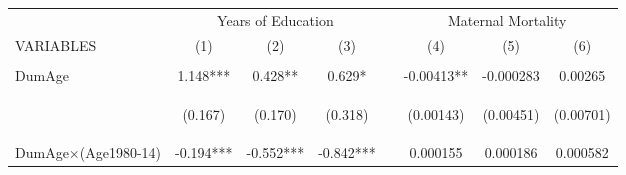 \begin{subtables}
\begin{landscape}														
\begin{table}[htpb!]														
\begin{center}														
\begin{tabular}{lcccp{0.3cm}ccc}	\toprule													
& 	\multicolumn{3}{c}{Years of Education}					& &\multicolumn{3}{c}{Maternal Mortality }	\\	
VARIABLES & 		(1)	&	(2)	&	(3)	&&	(4)	&	(5)	&	(6)	\\ \cline{1-4} \cline{6-8}	
\vspace{4pt}	&	\begin{footnotesize}\end{footnotesize}	&	\begin{footnotesize}\end{footnotesize}	&	\begin{footnotesize}\end{footnotesize}	& \begin{footnotesize}\end{footnotesize} &	\begin{footnotesize}\end{footnotesize}	&	\begin{footnotesize}\end{footnotesize}	&		\begin{footnotesize}\end{footnotesize}	 \\
DumAge  	&	1.148***	&	0.428**	&	0.629*	&&	-0.00413**	&	-0.000283	&	0.00265	 \\	
	& \begin{footnotesize}	(0.167)	\end{footnotesize} & \begin{footnotesize}	(0.170)	\end{footnotesize} & \begin{footnotesize}	(0.318)	\end{footnotesize} & \begin{footnotesize}\end{footnotesize} & \begin{footnotesize}	(0.00143)	\end{footnotesize} & \begin{footnotesize}	(0.00451)	\end{footnotesize} & \begin{footnotesize}	(0.00701)	\end{footnotesize} \\	
DumAge$\times$(Age1980-14)	&	-0.194***	&	-0.552***	&	-0.842***	&&	0.000155	&	0.000186	&	0.000582	 \\	

\end{tabular}
\end{center}
\end{table}
\end{landscape}
\end{subtables}
